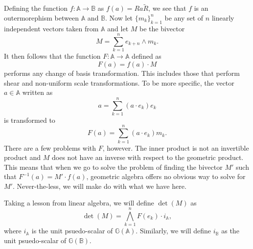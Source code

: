 \documentclass[12pt]{article}
\newcommand{\G}{\mathbb{G}}
\newcommand{\A}{\mathbb{A}}
\newcommand{\B}{\mathbb{B}}
\begin{document}
Defining the function $f:\A\to\B$ as $f(a)=Ra\tilde{R}$, we see that $f$ is an
outermorephism between $\A$ and $\B$.  Now let $\{m_k\}_{k=1}^n$ be any
set of $n$ linearly independent vectors taken from $\A$ and let $M$ be the
bivector
\begin{equation*}
M = \sum_{k=1}^n e_{k+n}\wedge m_k.
\end{equation*}
It then follows that the function $F:\A\to\A$ defined as
\begin{equation*}
F(a) = f(a)\cdot M
\end{equation*}
performs any change of basis transformation.  This includes those
that perform shear and non-uniform scale transformations.  To be more specific,
the vector $a\in\A$ written as
\begin{equation*}
a = \sum_{k=1}^n (a\cdot e_k)e_k
\end{equation*}
is transformed to
\begin{equation*}
F(a) = \sum_{k=1}^n (a\cdot e_k)m_k.
\end{equation*}
There are a few problems with $F$,
however.  The inner product is not an invertible product and $M$ does
not have an inverse with respect to the geometric product.  This means
that when we go to solve the problem of finding the bivector $M'$ such
that $F^{-1}(a) = M'\cdot f(a)$, geometric algebra offers no obvious
way to solve for $M'$.  Never-the-less, we will make do with what we have here.

Taking a lesson from linear algebra, we will define $\det(M)$ as
\begin{equation*}
\det(M) = \bigwedge_{k=1}^n F(e_k)\cdot i_{\A},
\end{equation*}
where $i_{\A}$ is the unit psuedo-scalar of $\G(\A)$.  Similarly, we will
define $i_{\B}$ as the unit psuedo-scalar of $\G(\B)$.
\end{document}
